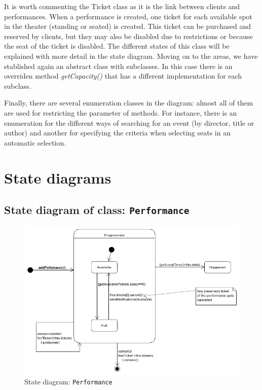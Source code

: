 \documentclass{article}
\begin{document}
It is worth commenting the Ticket class as it is the link between clients and performances. When a performance is created, one ticket for each available spot in the theater (standing or seated) is created. This ticket can be purchased and reserved by clients, but they may also be disabled due to restrictions or because the seat of the ticket is disabled.
The different states of this class will be explained with more detail in the state diagram.
Moving on to the areas, we have stablished again an abstract class with subclasses. In this case there is an overriden method \textit{getCapacity()} that has a different implementation for each subclass.

Finally, there are several enumeration classes in the diagram: almost all of them are used for restricting the parameter of methods. For instance, there is an enumeration for the different ways of searching
for an event (by director, title or author) and another for specifying the criteria when selecting seats in an automatic selection.



\newpage

\section{State diagrams}

\subsection{State diagram of class: \texttt{Performance}}

\begin{figure}[h]
    \centering
    \includegraphics[width=400pt]{../state2/perf}
    \caption{State diagram: \texttt{Performance}}
\end{figure}
\end{document}
